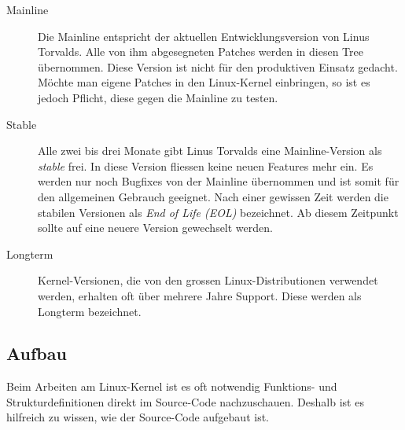 \begin{description}
   \item[Mainline]
      Die Mainline entspricht der aktuellen Entwicklungsversion von Linus Torvalds. Alle von ihm
      abgesegneten Patches werden in diesen Tree übernommen. Diese Version ist nicht für den produktiven
      Einsatz gedacht. Möchte man eigene Patches in den Linux-Kernel einbringen, so ist es jedoch Pflicht, diese 
      gegen die Mainline zu testen.

   \item[Stable]
      Alle zwei bis drei Monate gibt Linus Torvalds eine Mainline-Version als \emph{stable} frei. In diese Version fliessen 
      keine neuen Features mehr ein. Es werden nur noch Bugfixes von der Mainline übernommen und ist somit für den allgemeinen
      Gebrauch geeignet. Nach einer gewissen Zeit werden die stabilen Versionen als \emph{End of Life (EOL)}
      bezeichnet. Ab diesem Zeitpunkt sollte auf eine neuere Version gewechselt werden.

   \item[Longterm]
      Kernel-Versionen, die von den grossen Linux-Distributionen verwendet werden, erhalten oft über mehrere
      Jahre Support. Diese werden als Longterm bezeichnet.
\end{description}


\subsection{Aufbau} 

Beim Arbeiten am Linux-Kernel ist es oft notwendig Funktions- und Strukturdefinitionen direkt im Source-Code nachzuschauen. Deshalb ist
es hilfreich zu wissen, wie der Source-Code aufgebaut ist. \hfill \\

